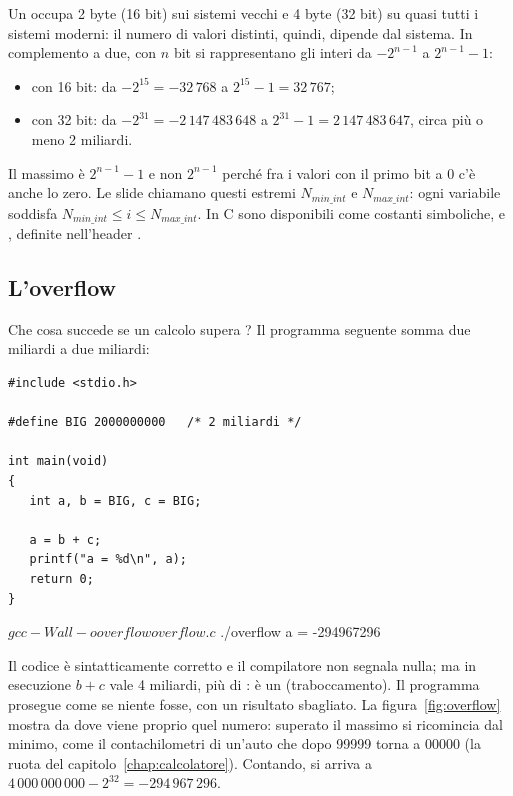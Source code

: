 Un  occupa 2 byte (16 bit) sui sistemi vecchi e 4 byte (32 bit)
su quasi tutti i sistemi moderni: il numero di valori distinti, quindi,
dipende dal sistema. In complemento a due, con $n$ bit si rappresentano gli
interi da $-2^{n-1}$ a $2^{n-1}-1$:

\begin{itemize}
  \item con 16 bit: da $-2^{15} = -32\,768$ a $2^{15} - 1 = 32\,767$;
  \item con 32 bit: da $-2^{31} = -2\,147\,483\,648$ a
        $2^{31} - 1 = 2\,147\,483\,647$, circa più o meno 2 miliardi.
\end{itemize}

Il massimo è $2^{n-1}-1$ e non $2^{n-1}$ perché fra i valori con il primo
bit a 0 c'è anche lo zero. Le slide chiamano questi estremi $N_{min\_int}$ e
$N_{max\_int}$: ogni variabile  soddisfa
$N_{min\_int} \le i \le N_{max\_int}$. In C sono disponibili come costanti
simboliche,  e , definite nell'header
.

\subsection{L'overflow}

Che cosa succede se un calcolo supera ? Il programma seguente
somma due miliardi a due miliardi:

\begin{affianco}[0.5][c]
\begin{lstlisting}[style=c, name=overflow.c]
#include <stdio.h>

#define BIG 2000000000   /* 2 miliardi */

int main(void)
{
   int a, b = BIG, c = BIG;

   a = b + c;
   printf("a = %d\n", a);
   return 0;
}
\end{lstlisting}
\risultato
\begin{console}
$ gcc -Wall -o overflow overflow.c
$ ./overflow
a = -294967296
\end{console}
\end{affianco}

Il codice è sintatticamente corretto e il compilatore non segnala nulla; ma
in esecuzione $b + c$ vale 4 miliardi, più di : è un
 (traboccamento). Il programma prosegue come se
niente fosse, con un risultato sbagliato. La figura~\ref{fig:overflow} mostra
da dove viene proprio quel numero: superato il massimo si ricomincia dal
minimo, come il contachilometri di un'auto che dopo 99999 torna a 00000 (la
ruota del capitolo~\ref{chap:calcolatore}). Contando, si arriva a
$4\,000\,000\,000 - 2^{32} = -294\,967\,296$.

